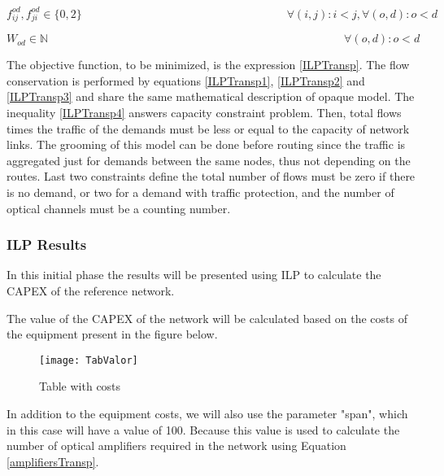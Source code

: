\vspace{-5pt}
\begin{equation}
f_{ij}^{od} , f_{ji}^{od} \in \{0,2\}   \qquad \qquad \qquad \qquad \qquad \qquad \qquad \qquad \qquad
\forall(i,j) : i < j, \forall(o,d) : o < d
\label{ILPTransp5}
\end{equation}

\vspace{-5pt}
\begin{equation}
W_{od} \in \mathbb{N}  \qquad \qquad \qquad \qquad \qquad \qquad \qquad \qquad \qquad \qquad \qquad \qquad \qquad
\forall(o,d) : o < d
\label{ILPTransp6}
\end{equation}

The objective function, to be minimized, is the expression \ref{ILPTransp}. The flow conservation is performed by equations \ref{ILPTransp1}, \ref{ILPTransp2} and \ref{ILPTransp3} and share the same mathematical description of opaque model. The inequality \ref{ILPTransp4} answers capacity constraint problem. Then, total flows times the traffic of the demands must be less or equal to the capacity of network links. The grooming of this model can be done before routing since the traffic is aggregated just for demands between the same nodes, thus not depending on the routes. Last two constraints define the total number of flows must be zero if there is no demand, or two for a demand with traffic protection, and the number of optical channels must be a counting number.

\subsubsection{ILP Results}

In this initial phase the results will be presented using ILP to calculate the CAPEX of the reference network.

The value of the CAPEX of the network will be calculated based on the costs of the equipment present in the figure below.
\begin{figure}[h!]
  \centering
  \texttt{[image: TabValor]}
  \caption{Table with costs}
  \label{TabCustTransp}
\end{figure}

In addition to the equipment costs, we will also use the parameter "span", which in this case will have a value of 100.
Because this value is used to calculate the number of optical amplifiers required in the network using Equation \ref{amplifiersTransp}.

